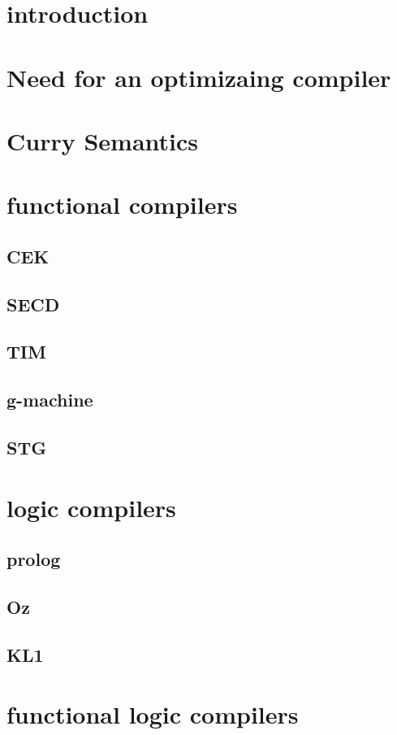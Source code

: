 \documentclass{article}
\begin{document}
\begin{abstract}
\end{abstract}

\section{introduction}
\section{Need for an optimizaing compiler}
\section{Curry Semantics}
\section{functional compilers}
\subsection{CEK}
\subsection{SECD}
\subsection{TIM}
\subsection{g-machine}
\subsection{STG}
\section{logic compilers}
\subsection{prolog}
\subsection{Oz}
\subsection{KL1}
\section{functional logic compilers}
\end{document}
